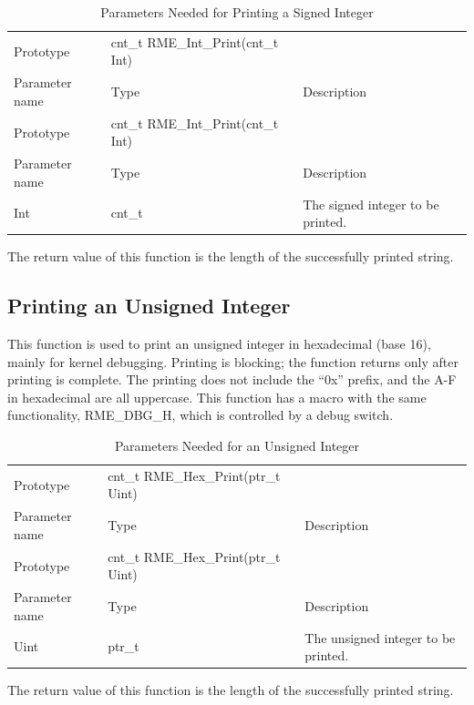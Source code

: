 \begin{xltabular}{\textwidth}{@{}>{\hsize\raggedright\arraybackslash}X>{\hsize\raggedright\arraybackslash}X>{\hsize\raggedright\arraybackslash}X@{}}
\caption{Parameters Needed for Printing a Signed Integer}\label{tab:7-88-print-signed-integer-parameters}\\
\toprule
Prototype & cnt\_t RME\_Int\_Print(cnt\_t Int) &\tabularnewline
Parameter name & Type & Description\tabularnewline
\endfirsthead
\toprule
Prototype & cnt\_t RME\_Int\_Print(cnt\_t Int) &\tabularnewline
Parameter name & Type & Description\tabularnewline
\midrule
\endhead
\bottomrule
\endlastfoot
Int & cnt\_t & The signed integer to be printed.\tabularnewline
\end{xltabular}
\nopagebreak[4]

The return value of this function is the length of the successfully printed string.

\subsection{Printing an Unsigned Integer}\label{subsec:7-print-unsigned-integer}

This function is used to print an unsigned integer in hexadecimal (base 16), mainly for kernel debugging. Printing is blocking; the function returns only after printing is complete. The printing does not include the ``0x'' prefix, and the A-F in hexadecimal are all uppercase. This function has a macro with the same functionality, RME\_DBG\_H, which is controlled by a debug switch.

\begin{xltabular}{\textwidth}{@{}>{\hsize\raggedright\arraybackslash}X>{\hsize\raggedright\arraybackslash}X>{\hsize\raggedright\arraybackslash}X@{}}
\caption{Parameters Needed for an Unsigned Integer}\label{tab:7-89-print-unsigned-integer-parameters}\\
\toprule
Prototype & cnt\_t RME\_Hex\_Print(ptr\_t Uint) &\tabularnewline
Parameter name & Type & Description\tabularnewline
\endfirsthead
\toprule
Prototype & cnt\_t RME\_Hex\_Print(ptr\_t Uint) &\tabularnewline
Parameter name & Type & Description\tabularnewline
\midrule
\endhead
\bottomrule
\endlastfoot
Uint & ptr\_t & The unsigned integer to be printed.\tabularnewline
\end{xltabular}
\nopagebreak[4]

The return value of this function is the length of the successfully printed string.

